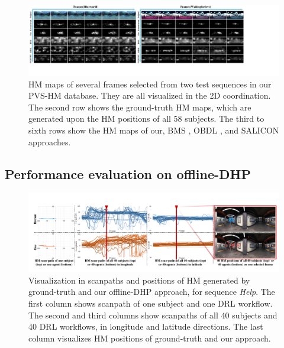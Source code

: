 \documentclass[10pt,journal,compsoc]{IEEEtran}
\begin{document}
\begin{figure}
\vspace{-1em}
	\begin{center}
		\centerline{\includegraphics[width=2\columnwidth]{figures/experiment/objective_result_1}}%
\vspace{-1em}
                  \caption{\footnotesize{HM maps of several frames selected from two test sequences in our PVS-HM database. They are all visualized in the 2D coordination.  The second row shows the ground-truth HM maps, which are generated upon the HM positions of all 58 subjects. The third to sixth rows show the HM maps of our, BMS \cite{zhang2016exploiting} , OBDL \cite{hossein2015many}, and SALICON \cite{huang2015salicon} approaches. }}
		\label{figure-object}
	\end{center}
\end{figure}



\subsection{Performance evaluation on offline-DHP}\label{sec:evaluation_offline}
\label{compare}



\begin{figure}
\vspace{-1em}
	\begin{center}
		\centerline{\includegraphics[width=2\columnwidth]{figures/experiment/scanpath_objective_result}}%
\vspace{-.5em}
                   \caption{\footnotesize{Visualization in scanpaths and positions of HM generated by ground-truth and our offline-DHP approach, for sequence \textit{Help}. The first column shows scanpath of one subject and one DRL workflow. The second and third columns show scanpaths of all 40 subjects and 40 DRL workflows, in longitude and latitude directions. The last column visualizes HM positions of ground-truth and our approach.}}
		\label{scan-path-example}
	\end{center}
\vspace{-2em}
\end{figure}
\end{document}

